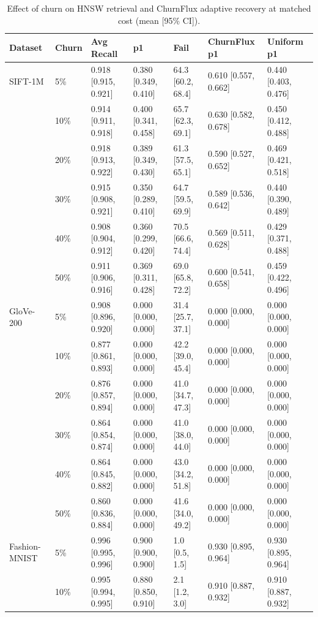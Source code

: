 \documentclass{ieeeaccess}
\begin{document}
\begin{table}[t]
\centering
\caption{Effect of churn on HNSW retrieval and ChurnFlux adaptive recovery at matched cost (mean [95\% CI]).}
\label{tab:churn}
\begin{tabular}{lllllll}
\toprule
Dataset & Churn & Avg Recall & p1 & Fail & ChurnFlux p1 & Uniform p1 \\
\midrule
SIFT-1M & 5\% & 0.918 [0.915, 0.921] & 0.380 [0.349, 0.410] & 64.3 [60.2, 68.4] & 0.610 [0.557, 0.662] & 0.440 [0.403, 0.476] \\
 & 10\% & 0.914 [0.911, 0.918] & 0.400 [0.341, 0.458] & 65.7 [62.3, 69.1] & 0.630 [0.582, 0.678] & 0.450 [0.412, 0.488] \\
 & 20\% & 0.918 [0.913, 0.922] & 0.389 [0.349, 0.430] & 61.3 [57.5, 65.1] & 0.590 [0.527, 0.652] & 0.469 [0.421, 0.518] \\
 & 30\% & 0.915 [0.908, 0.921] & 0.350 [0.289, 0.410] & 64.7 [59.5, 69.9] & 0.589 [0.536, 0.642] & 0.440 [0.390, 0.489] \\
 & 40\% & 0.908 [0.904, 0.912] & 0.360 [0.299, 0.420] & 70.5 [66.6, 74.4] & 0.569 [0.511, 0.628] & 0.429 [0.371, 0.488] \\
 & 50\% & 0.911 [0.906, 0.916] & 0.369 [0.311, 0.428] & 69.0 [65.8, 72.2] & 0.600 [0.541, 0.658] & 0.459 [0.422, 0.496] \\
\midrule
GloVe-200 & 5\% & 0.908 [0.896, 0.920] & 0.000 [0.000, 0.000] & 31.4 [25.7, 37.1] & 0.000 [0.000, 0.000] & 0.000 [0.000, 0.000] \\
 & 10\% & 0.877 [0.861, 0.893] & 0.000 [0.000, 0.000] & 42.2 [39.0, 45.4] & 0.000 [0.000, 0.000] & 0.000 [0.000, 0.000] \\
 & 20\% & 0.876 [0.857, 0.894] & 0.000 [0.000, 0.000] & 41.0 [34.7, 47.3] & 0.000 [0.000, 0.000] & 0.000 [0.000, 0.000] \\
 & 30\% & 0.864 [0.854, 0.874] & 0.000 [0.000, 0.000] & 41.0 [38.0, 44.0] & 0.000 [0.000, 0.000] & 0.000 [0.000, 0.000] \\
 & 40\% & 0.864 [0.845, 0.882] & 0.000 [0.000, 0.000] & 43.0 [34.2, 51.8] & 0.000 [0.000, 0.000] & 0.000 [0.000, 0.000] \\
 & 50\% & 0.860 [0.836, 0.884] & 0.000 [0.000, 0.000] & 41.6 [34.0, 49.2] & 0.000 [0.000, 0.000] & 0.000 [0.000, 0.000] \\
\midrule
Fashion-MNIST & 5\% & 0.996 [0.995, 0.996] & 0.900 [0.900, 0.900] & 1.0 [0.5, 1.5] & 0.930 [0.895, 0.964] & 0.930 [0.895, 0.964] \\
 & 10\% & 0.995 [0.994, 0.995] & 0.880 [0.850, 0.910] & 2.1 [1.2, 3.0] & 0.910 [0.887, 0.932] & 0.910 [0.887, 0.932] \\

\end{tabular}
\end{table}
\end{document}

